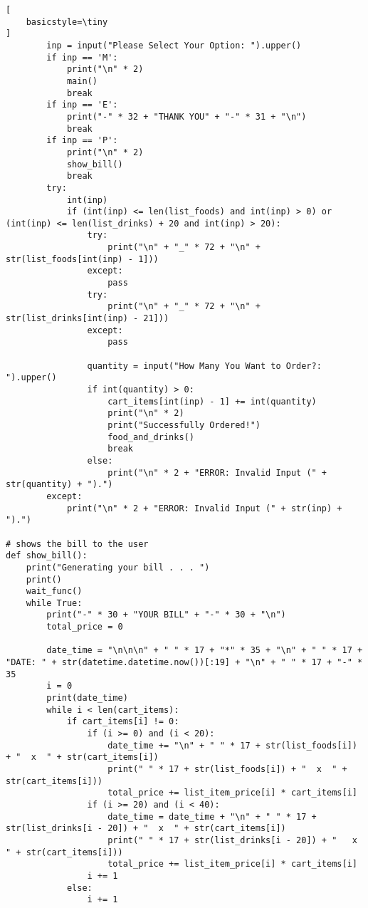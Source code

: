 \documentclass[11pt, a4paper]{article}
\begin{document}
\begin{lstlisting}[
    basicstyle=\tiny
]
        inp = input("Please Select Your Option: ").upper()
        if inp == 'M':
            print("\n" * 2)
            main()
            break
        if inp == 'E':
            print("-" * 32 + "THANK YOU" + "-" * 31 + "\n")
            break
        if inp == 'P':
            print("\n" * 2)
            show_bill()
            break
        try:
            int(inp)
            if (int(inp) <= len(list_foods) and int(inp) > 0) or (int(inp) <= len(list_drinks) + 20 and int(inp) > 20):
                try:
                    print("\n" + "_" * 72 + "\n" + str(list_foods[int(inp) - 1]))
                except:
                    pass
                try:
                    print("\n" + "_" * 72 + "\n" + str(list_drinks[int(inp) - 21]))
                except:
                    pass

                quantity = input("How Many You Want to Order?: ").upper()
                if int(quantity) > 0:
                    cart_items[int(inp) - 1] += int(quantity)
                    print("\n" * 2)
                    print("Successfully Ordered!")
                    food_and_drinks()
                    break
                else:
                    print("\n" * 2 + "ERROR: Invalid Input (" + str(quantity) + ").")
        except:
            print("\n" * 2 + "ERROR: Invalid Input (" + str(inp) + ").")

# shows the bill to the user
def show_bill():
    print("Generating your bill . . . ")
    print()
    wait_func()
    while True:
        print("-" * 30 + "YOUR BILL" + "-" * 30 + "\n")
        total_price = 0

        date_time = "\n\n\n" + " " * 17 + "*" * 35 + "\n" + " " * 17 + "DATE: " + str(datetime.datetime.now())[:19] + "\n" + " " * 17 + "-" * 35
        i = 0
        print(date_time)
        while i < len(cart_items):
            if cart_items[i] != 0:
                if (i >= 0) and (i < 20):
                    date_time += "\n" + " " * 17 + str(list_foods[i]) + "  x  " + str(cart_items[i])
                    print(" " * 17 + str(list_foods[i]) + "  x  " + str(cart_items[i]))
                    total_price += list_item_price[i] * cart_items[i]
                if (i >= 20) and (i < 40):
                    date_time = date_time + "\n" + " " * 17 + str(list_drinks[i - 20]) + "  x  " + str(cart_items[i])
                    print(" " * 17 + str(list_drinks[i - 20]) + "   x  " + str(cart_items[i]))
                    total_price += list_item_price[i] * cart_items[i]
                i += 1
            else:
                i += 1


\end{lstlisting}
\end{document}
